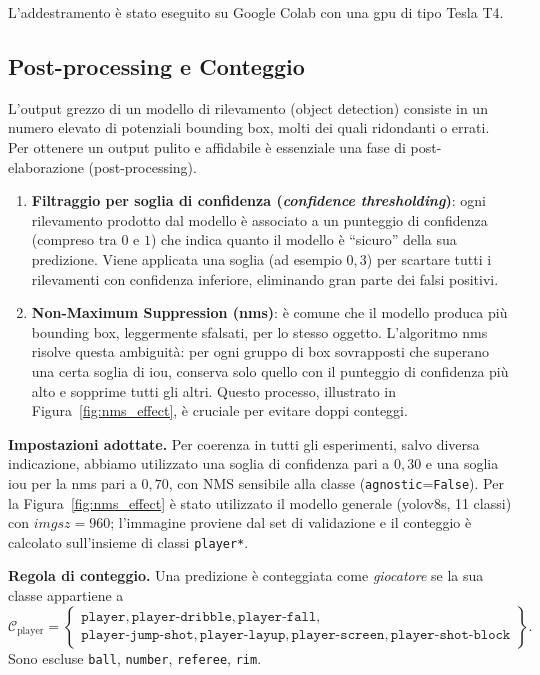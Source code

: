 \documentclass[12pt,a4paper,openright,twoside]{book}
\begin{document}
\noindent L'addestramento è stato eseguito su Google Colab con una 
\ac{gpu} di tipo Tesla T4.

\subsection{Post-processing e Conteggio}
\label{subsec:post-processing-conteggio}

L'output grezzo di un modello di rilevamento (object detection) 
consiste in un numero elevato di potenziali bounding box, molti 
dei quali ridondanti o errati. Per ottenere un output pulito e 
affidabile è essenziale una fase di post-elaborazione (post-processing).

\begin{enumerate}
  \item \textbf{Filtraggio per soglia di confidenza (\emph{confidence 
  thresholding})}: ogni rilevamento prodotto dal modello è associato 
  a un punteggio di confidenza (compreso tra $0$ e $1$) che indica 
  quanto il modello è ``sicuro'' della sua predizione. Viene applicata 
  una soglia (ad esempio $0{,}3$) per scartare tutti i rilevamenti con 
  confidenza inferiore, eliminando gran parte dei falsi positivi.
  \item \textbf{Non-Maximum Suppression (\ac{nms})}: è comune che il 
  modello produca più bounding box, leggermente sfalsati, per lo stesso 
  oggetto. L'algoritmo \ac{nms} risolve questa ambiguità: per ogni gruppo 
  di box sovrapposti che superano una certa soglia di \ac{iou}, conserva 
  solo quello con il punteggio di confidenza più alto e sopprime tutti 
  gli altri. Questo processo, illustrato in Figura~\ref{fig:nms_effect}, 
  è cruciale per evitare doppi conteggi.
\end{enumerate}

\noindent\textbf{Impostazioni adottate.}
Per coerenza in tutti gli esperimenti, salvo diversa indicazione, 
abbiamo utilizzato una soglia di confidenza pari a $0{,}30$ e una 
soglia \ac{iou} per la \ac{nms} pari a $0{,}70$, con NMS sensibile 
alla classe (\texttt{agnostic}=\texttt{False}). Per la Figura~\ref{fig:nms_effect} 
è stato utilizzato il modello generale (\ac{yolo}v8s, 11 classi) con $imgsz=960$; 
l'immagine proviene dal set di validazione e il conteggio è calcolato 
sull'insieme di classi \texttt{player*}.

\noindent\textbf{Regola di conteggio.} Una predizione è conteggiata come 
\emph{giocatore} se la sua classe appartiene a
\[
\mathcal{C}_{\mathrm{player}}=
\left\{
\begin{array}{l}
\texttt{player}, \texttt{player-dribble}, \texttt{player-fall},\\
\texttt{player-jump-shot}, \texttt{player-layup}, \texttt{player-screen}, \texttt{player-shot-block}
\end{array}
\right\}.
\]
Sono escluse \texttt{ball}, \texttt{number}, \texttt{referee}, \texttt{rim}.
\end{document}
